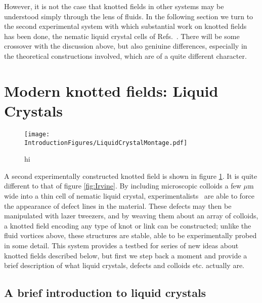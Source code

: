 However, it is not the case that knotted fields in other systems may be understood simply through the lens of fluids. In the following section we turn to the second experimental system with which substantial work on knotted fields has been done, the nematic liquid crystal cells of Refs.~\citep{Tkalec2011,Tasinkevych2014,Copar2015}. There will be some crossover with the discussion above, but also geniuine differences, especially in the theoretical constructions involved, which are of a quite different character. 
\section{Modern knotted fields: Liquid Crystals}
\begin{figure}[htbp]
\centering
\texttt{[image: \\IntroductionFigures/LiquidCrystalMontage.pdf]}
\caption{hi }
\label{fig:KnottedLiquidCrystal}
\end{figure}
A second experimentally constructed knotted field is shown in figure \ref{fig:KnottedLiquidCrystal}. It is quite different to that of figure \ref{fig:Irvine}. By including microscopic colloids a few $\mu$m wide into a thin cell of nematic liquid crystal, experimentalists~\citep{Tkalec2011,Tasinkevych2014,Copar2015} are able to force the appearance of defect lines in the material. These defects may then be manipulated with lazer tweezers, and by weaving them about an array of colloids, a knotted field encoding any type of knot or link can be constructed; unlike the fluid vortices above, these structures are stable, able to be experimentally probed in some detail. This system provides a testbed for series of new ideas about knotted fields described below, but first we step back a moment and provide a brief description of what liquid crystals, defects and colloids etc. actually are.

\subsection{A brief introduction to liquid crystals}

